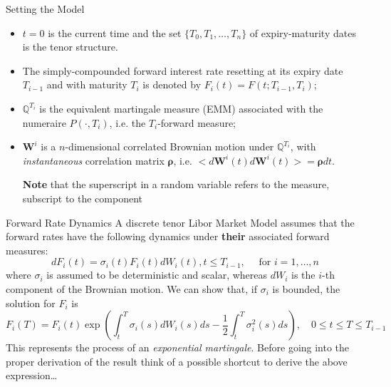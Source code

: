 \documentclass{beamer}
\begin{document}
\begin{frame}{Setting the Model}
	\begin{itemize}
		\item<1-> $t = 0$ is the current time and the set $\{T_0, T_1, \dots, T_n\}$ of expiry-maturity dates is the tenor structure. %
		\item<2-> The simply-compounded forward interest rate resetting at its expiry date $T_{i-1}$ and with maturity $T_i$ is denoted by $F_i(t) = F(t; T_{i-1}, T_i)$;
		\item<3-> $\mathbb{Q}^{T_i}$ is the equivalent martingale measure (EMM) associated with the numeraire $P(\cdot, T_i)$, i.e. the $T_i$-forward measure;
		\item<4-> $\bm{W}^i$ is a $n$-dimensional \textcolor{maincolor}{correlated} Brownian motion under $\mathbb{Q}^{T_i}$, with \emph{instantaneous} correlation matrix $\bm{\rho}$, i.e. $< d\bm{W}^i(t) d\bm{W}^i(t)> = \bm{\rho} dt$.
		
		\textbf{Note} that the superscript in a random variable refers to the measure, subscript to the component
	\end{itemize}
\end{frame}

\begin{frame}{Forward Rate Dynamics}
	A discrete tenor Libor Market Model assumes that the forward rates have the following dynamics under \textbf{their} associated forward measures:
	\begin{equation}
		dF_i(t) = \sigma_i(t)F_i(t)dW_i(t), t \le T_{i-1},\quad\text{ for } i = 1,\ldots, n
		\label{eq:forward_process_lmm}
	\end{equation}
	where $\sigma_i$ is assumed to be deterministic and scalar, whereas $dW_i$ is the $i$-th component of the Brownian motion.
	\pause
	We can show that, if $\sigma_i$ is bounded, the solution for $F_i$ is
	\begin{equation*}
		F_i(T) = F_i(t) \exp\left(\int_t^T\sigma_i(s)dW_i(s)ds - \frac{1}{2}\int_t^T
		\sigma_i^2(s)ds\right),\quad 0\le t \le T \le T_{i-1}
	\end{equation*}
	This represents the process of an \emph{exponential martingale}. Before going into the proper derivation of the result think of a possible shortcut to derive the above expression\ldots
\end{frame}
\end{document}
